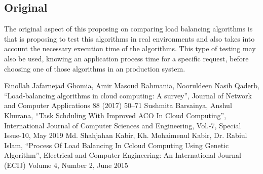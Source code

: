 \documentclass[conference]{IEEEtran}
\begin{document}
\subsection{Original}
The original aspect of this proposing on comparing load balancing algorithms is that is proposing to test this algorithms in real environments and also takes into account the necessary execution time of the algorithms. This type of testing may also be used, knowing an application process time for a specific request, before choosing one of those algorithms in an production system.
\begin{thebibliography}{00}
 Einollah Jafarnejad Ghomia, Amir Masoud Rahmania, Nooruldeen Nasih Qaderb, “Load-balancing algorithms in cloud computing: A survey”, Journal of Network and Computer Applications 88 (2017) 50–71
 Sushmita Barsainya, Anshul Khurana, “Task Schduling With Improved ACO In Cloud Computing”, International Journal of Computer Sciences and Engineering, Vol.-7, Special Issue-10, May 2019
 Md. Shahjahan Kabir, Kh. Mohaimenul Kabir, Dr. Rabiul Islam, “Process Of Load Balancing In Ccloud Computing Using Genetic Algorithm”, Electrical and Computer Engineering: An International Journal (ECIJ) Volume 4, Number 2, June 2015
\end{thebibliography}
\end{document}
